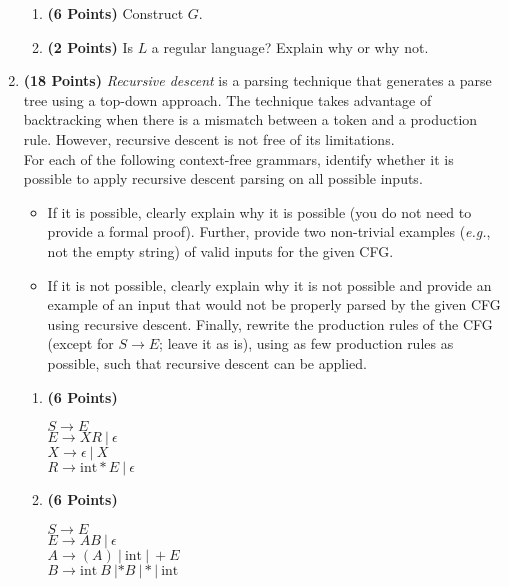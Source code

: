 \documentclass{article}[12pt]
\begin{document}
\begin{enumerate}
    \begin{enumerate}
        \item \textbf{(6 Points)} Construct $G$.
        \item \textbf{(2 Points)} Is $L$ a regular language? Explain why or why not.
    \end{enumerate}
    
    \pagebreak
    \item \textbf{(18 Points)} \textit{Recursive descent} is a parsing technique that generates a parse tree using a top-down approach. The technique takes advantage of backtracking when there is a mismatch between a token and a production rule. However, recursive descent is not free of its limitations.\\
    
    For each of the following context-free grammars, identify whether it is possible to apply recursive descent parsing on all possible inputs.
    \begin{itemize}
        \item If it is possible, clearly explain why it is possible (you do not need to provide a formal proof). Further, provide two non-trivial examples (\textit{e.g.}, not the empty string) of valid inputs for the given CFG.
        \item If it is not possible, clearly explain why it is not possible and provide an example of an input that would not be properly parsed by the given CFG using recursive descent. Finally, rewrite the production rules of the CFG (except for $S \rightarrow E$; leave it as is), using as few production rules as possible, such that recursive descent can be applied.
    \end{itemize}
    \begin{enumerate}
        \item \textbf{(6 Points)}
        \begin{center}
            $S \rightarrow E$\\
            $E \rightarrow XR~|~\epsilon$\\
            $X \rightarrow \epsilon~|~X~$\\
            $R \rightarrow \mathrm{int} * E~|~\epsilon$
        \end{center}

        \item \textbf{(6 Points)}\\
        \begin{center}
            $S \rightarrow E$\\
            $E \rightarrow AB~|~\epsilon$\\
            $A \rightarrow ( A )~|~\mathrm{int}~| ~+E$\\
            $B \rightarrow \mathrm{int}~B~| * B~| * |~\mathrm{int}$
        \end{center}


\end{enumerate}
\end{enumerate}
\end{document}
